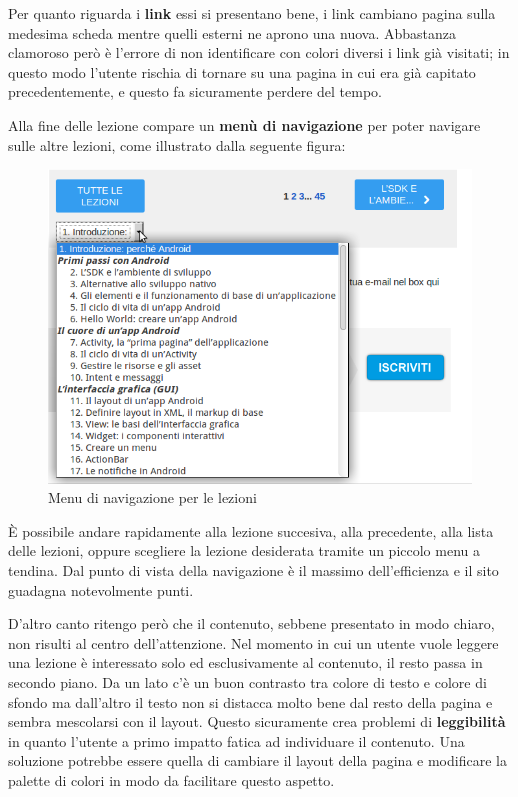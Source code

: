 Per quanto riguarda i \textbf{link} essi si presentano bene, i link cambiano pagina sulla medesima scheda mentre quelli esterni ne aprono una nuova. Abbastanza clamoroso però è l'errore di non identificare con colori diversi i link già visitati; in questo modo l'utente rischia di tornare su una pagina in cui era già capitato precedentemente, e questo fa sicuramente perdere del tempo.

Alla fine delle lezione compare un \textbf{menù di navigazione} per poter navigare sulle altre lezioni, come illustrato dalla seguente figura:

\begin{figure}[H]
\centering
\includegraphics[width=120mm]{images/internal4.png}
\caption{Menu di navigazione per le lezioni}
\end{figure}

È possibile andare rapidamente alla lezione succesiva, alla precedente, alla lista delle lezioni, oppure scegliere la lezione desiderata tramite un piccolo menu a tendina. Dal punto di vista della navigazione è il massimo dell'efficienza e il sito guadagna notevolmente punti.

D'altro canto ritengo però che il contenuto, sebbene presentato in modo chiaro, non risulti al centro dell'attenzione. Nel momento in cui un utente vuole leggere una lezione è interessato solo ed esclusivamente al contenuto, il resto passa in secondo piano. Da un lato c'è un buon contrasto tra colore di testo e colore di sfondo ma dall'altro il testo non si distacca molto bene dal resto della pagina e sembra mescolarsi con il layout. Questo sicuramente crea problemi di \textbf{leggibilità} in quanto l'utente a primo impatto fatica ad individuare il contenuto. Una soluzione potrebbe essere quella di cambiare il layout della pagina e modificare la palette di colori in modo da facilitare questo aspetto.

